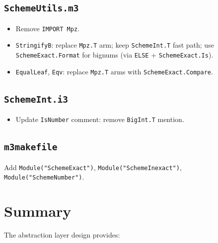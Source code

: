 \documentclass[12pt]{article}
\begin{document}
\subsection{{\tt SchemeUtils.m3}}

\begin{itemize}[nosep]
\item Remove {\tt IMPORT Mpz}.
\item {\tt StringifyB}: replace {\tt Mpz.T} arm; keep
  {\tt SchemeInt.T} fast path; use {\tt SchemeExact.Format}
  for bignums (via {\tt ELSE} + {\tt SchemeExact.Is}).
\item {\tt EqualLeaf}, {\tt Eqv}: replace {\tt Mpz.T} arms
  with {\tt SchemeExact.Compare}.
\end{itemize}

\subsection{{\tt SchemeInt.i3}}

\begin{itemize}[nosep]
\item Update {\tt IsNumber} comment: remove {\tt BigInt.T} mention.
\end{itemize}

\subsection{{\tt m3makefile}}

Add {\tt Module("SchemeExact")}, {\tt Module("SchemeInexact")},
{\tt Module("SchemeNumber")}.

\section{Summary}
\label{sec:summary}

The abstraction layer design provides:
\end{document}
